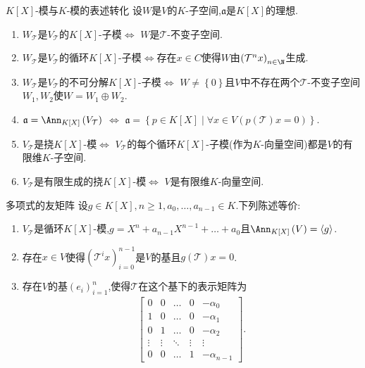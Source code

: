\begin{proposition}{$K[X]$-模与$K$-模的表述转化}{}
	设$W$是$V$的$K$-子空间,$\mathfrak{a}$是$K[X]$的理想.
	\begin{enumerate}
		\item $W_{\mathcal{T}}$是$V_{\mathcal{T}}$的$K[X]$-子模$\iff$ $W$是$\mathcal{T}$-不变子空间.
		\item $W_{\mathcal{T}}$是$V_{\mathcal{T}}$的循环$K[X]$-子模$\iff$存在$x\in C$使得$W$由$\left(\mathcal{T}^{n}x\right)_{n\in\N}$生成.
		\item $W_{\mathcal{T}}$是$V_{\mathcal{T}}$的不可分解$K[X]$-子模$\iff$ $W\neq\left\{0\right\}$且$V$中不存在两个$\mathcal{T}$-不变子空间$W_{1},W_{2}$使$W=W_{1}\oplus W_{2}$.
		\item $\mathfrak{a}=\Ann_{K\left[X\right]}\left(V_{\mathcal{T}}\right)$ $\iff$ $\mathfrak{a}=\left\{p\in K[X]\middle|\forall x\in V\left(p\left(\mathcal{T}\right)x=0\right)\right\}$.
		\item $V_{\mathcal{T}}$是挠$K[X]$-模$\iff$ $V_{\mathcal{T}}$的每个循环$K[X]$-子模(作为$K$-向量空间)都是$V$的有限维$K$-子空间.
		\item $V_{\mathcal{T}}$是有限生成的挠$K[X]$-模$\iff$ $V$是有限维$K$-向量空间.
	\end{enumerate}
\end{proposition}

\begin{proposition}{多项式的友矩阵}{}
	设$g\in K[X],n\geq 1,a_{0},\ldots,a_{n-1}\in K$.下列陈述等价:
	\begin{enumerate}
		\item $V_{\mathcal{T}}$是循环$K[X]$-模,$g=X^{n}+a_{n-1}X^{n-1}+\ldots+a_{0}$且$\Ann_{K[X]}\left(V\right)=\langle g\rangle$.
		\item 存在$x\in V$使得$\left(\mathcal{T}^{i}x\right)_{i=0}^{n-1}$是$V$的基且$g\left(\mathcal{T}\right)x=0$.
		\item 存在$V$的基$\left(e_{i}\right)_{i=1}^{n}$,使得$\mathcal{T}$在这个基下的表示矩阵为
		\begin{align*}
			\begin{bmatrix}
				0 & 0 & \ldots & 0 & -\alpha_{0}\\
				1 & 0 & \ldots & 0 & -\alpha_{1}\\
				0 & 1 & \ldots & 0 & -\alpha_{2}\\
				\vdots & \vdots & \ddots & \vdots & \vdots\\
				0  & 0 & \ldots & 1 &-\alpha_{n-1}
			\end{bmatrix}.
		\end{align*}
	\end{enumerate}
\end{proposition}

